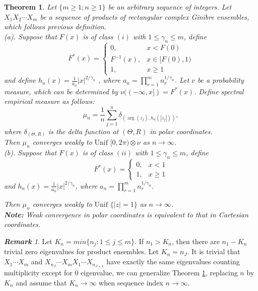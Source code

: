 \documentclass[12pt]{article}
\theoremstyle{plain}
\newtheorem{thm}{\textbf{Theorem}}
\theoremstyle{definition}
\theoremstyle{remark}
\newtheorem{rem}{\textbf{Remark}}
\begin{document}
\begin{thm}\label{thm:main theorem}
    Let $\{m\geq 1;n\geq 1\}$ be an arbitrary sequence of integers. Let $X_1X_2\cdots X_{m}$ be a sequence of products of rectangular complex Ginibre ensembles, which follows previous definition.\\

   \noindent (a). Suppose that $F(x)$ is of class $(i)$  with $1\leq\gamma_n\leq m$, define
    \begin{equation*}
    F^{*}(x)=\left\{\begin{array}{cc}{0,} & {x < F(0)} \\ {F^{-1}(x),} & {x \in[F(0),1)} \\ {1,} & {x \geq 1}\end{array}\right.
    \end{equation*}
    and define $h_n(x)=\frac{1}{a_n}|x|^{2/\gamma_{n}}$ , where $a_n=\prod_{r=1}^{m}n_r^{1/\gamma_{n}}$. Let $v$ be a probability measure, which can be determined by $\nu((-\infty,x])=F^*(x)$. Define spectral empirical measure as follows:
    \begin{equation*}
    \mu_{n}=\frac{1}{n} \sum_{j=1}^{n} \delta_{({\arg} (z_{j}), h_n(\left|z_{j}\right|))},
    \end{equation*}
    where  $\delta_{(\Theta,R)}$ is the delta function at $(\Theta,R)$ in polar coordinates.\\
    Then $\mu_{n}$ converges weakly to$\text { Unif }[0,2 \pi) \otimes \nu$ as $n\to
    \infty$.\\

     \noindent (b). Suppose that $F(x)$ is of class $(ii)$ with $1\leq\gamma_n\leq m$, define
    \begin{equation*}
    F^{*}(x)=\left\{\begin{array}{cc}{0,} & {x < 1} \\ {1,} & {x \geq 1}\end{array}\right.
    \end{equation*}
    and $h_n(x)=\frac{1}{a_n}|x|^{2/\gamma_{n}}$, where $a_n=\prod_{r=1}^{m}n_r^{1/\gamma_{n}}$.
    
    Then $\mu_{n}$ converges weakly to$\text { Unif }\{|z|=1\}$ as $n\to \infty$.\\
\textbf{Note:} Weak convergence in polar coordinates is equivalent to that in Cartesian coordinates.
\end{thm}


\begin{rem}\label{rem: discard eigenvalue}
    Let $K_n=min\{ n_j : 1\leq j\leq m\}$. If $n_1>K_n $, then there are $n_1-K_n$ trivial zero eigenvalues for product ensembles. Let $K_n=n_J$. It is trivial that $X_{1} \cdots X_{m}$ and $X_{n_J} \cdots X_{m} X_{1} \cdots X_{n_{J+1}}$ have exactly the same eigenvalues counting multiplicity except for 0 eigenvalue, we can generalize Theorem \ref{thm:main theorem},  replacing $n$ by $K_n$ and assume that $K_n\rightarrow \infty$ when sequence index $n\rightarrow \infty$.
\end{rem}
\end{document}
